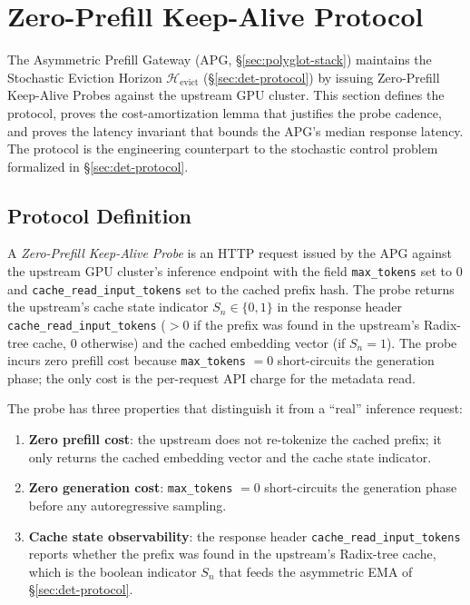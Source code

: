 \setcounter{section}{8}
\section{Zero-Prefill Keep-Alive Protocol}
\label{sec:zero-prefill-protocol}

The Asymmetric Prefill Gateway (APG, \S\ref{sec:polyglot-stack})
maintains the Stochastic Eviction Horizon $\mathcal{H}_{\text{evict}}$
(\S\ref{sec:det-protocol}) by issuing Zero-Prefill Keep-Alive Probes
against the upstream GPU cluster. This section defines the protocol,
proves the cost-amortization lemma that justifies the probe cadence,
and proves the latency invariant that bounds the APG's median
response latency. The protocol is the engineering counterpart to the
stochastic control problem formalized in \S\ref{sec:det-protocol}.

\subsection{Protocol Definition}

\begin{definition}
\label{def:zero-prefill-probe}
A \emph{Zero-Prefill Keep-Alive Probe} is an HTTP request issued by
the APG against the upstream GPU cluster's inference endpoint with the
field \texttt{max\_tokens} set to $0$ and \texttt{cache\_read\_input\_tokens}
set to the cached prefix hash. The probe returns the upstream's cache
state indicator $S_n \in \{0, 1\}$ in the response header
\texttt{cache\_read\_input\_tokens} ($> 0$ if the prefix was found in
the upstream's Radix-tree cache, $0$ otherwise) and the cached
embedding vector (if $S_n = 1$). The probe incurs zero prefill cost
because \texttt{max\_tokens} $= 0$ short-circuits the generation
phase; the only cost is the per-request API charge for the metadata
read.
\end{definition}

The probe has three properties that distinguish it from a ``real''
inference request:
\begin{enumerate}
\item \textbf{Zero prefill cost}: the upstream does not re-tokenize
the cached prefix; it only returns the cached embedding vector and
the cache state indicator.

\item \textbf{Zero generation cost}: \texttt{max\_tokens} $= 0$
short-circuits the generation phase before any autoregressive
sampling.

\item \textbf{Cache state observability}: the response header
\texttt{cache\_read\_input\_tokens} reports whether the prefix was
found in the upstream's Radix-tree cache, which is the boolean
indicator $S_n$ that feeds the asymmetric EMA of
\S\ref{sec:det-protocol}.
\end{enumerate}

